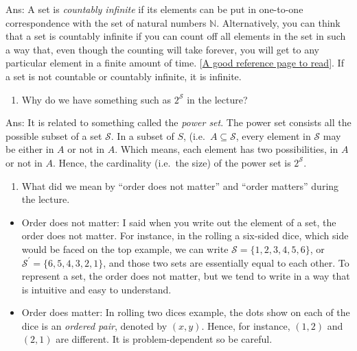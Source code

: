 \documentclass[
]{book}
\providecommand{\tightlist}{%
  \setlength{\itemsep}{0pt}\setlength{\parskip}{0pt}}
\theoremstyle{definition}
\theoremstyle{definition}
\theoremstyle{definition}
\theoremstyle{definition}
\theoremstyle{remark}
\begin{document}
Ans: A set is \emph{countably infinite} if its elements can be put in one-to-one correspondence with the set of natural numbers \(\mathbb{N}\). Alternatively, you can think that a set is countably infinite if you can count off all elements in the set in such a way that, even though the counting will take forever, you will get to any particular element in a finite amount of time. {[}\href{https://mathinsight.org/definition/countably_infinite}{A good reference page to read}{]}. If a set is not countable or countably infinite, it is infinite.

\begin{enumerate}
\def\labelenumi{\arabic{enumi}.}
\setcounter{enumi}{1}
\tightlist
\item
  Why do we have something such as \(2^\mathcal{S}\) in the lecture?
\end{enumerate}

Ans: It is related to something called the \emph{power set}. The power set consists all the possible subset of a set \(\mathcal{S}\). In a subset of \(S\), (i.e.~\(A \subseteq \mathcal{S}\), every element in \(\mathcal{S}\) may be either in \(A\) or not in \(A\). Which means, each element has two possibilities, in \(A\) or not in \(A\). Hence, the cardinality (i.e.~the size) of the power set is \(2^\mathcal{S}\).

\begin{enumerate}
\def\labelenumi{\arabic{enumi}.}
\setcounter{enumi}{2}
\tightlist
\item
  What did we mean by ``order does not matter'' and ``order matters'' during the lecture.
\end{enumerate}

\begin{itemize}
\item
  Order does not matter: I said when you write out the element of a set, the order does not matter. For instance, in the rolling a six-sided dice, which side would be faced on the top example, we can write \(\mathcal{S} = \{1,2,3,4,5,6\}\), or \(\mathcal{S}^\prime=\{6,5,4,3,2,1\}\), and those two sets are essentially equal to each other. To represent a set, the order does not matter, but we tend to write in a way that is intuitive and easy to understand.
\item
  Order does matter: In rolling two dices example, the dots show on each of the dice is an \emph{ordered pair}, denoted by \((x,y)\). Hence, for instance, \((1,2)\) and \((2,1)\) are different. It is problem-dependent so be careful.
\end{itemize}
\end{document}
